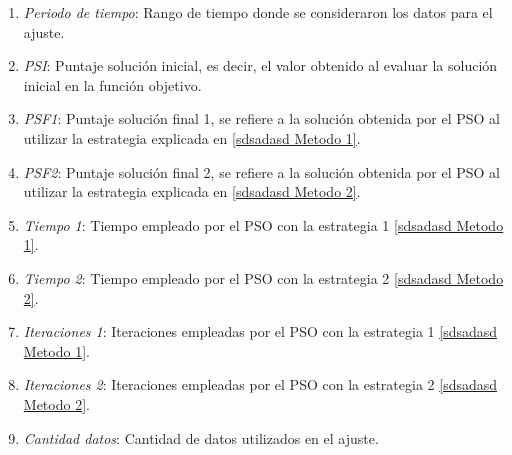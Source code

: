 \begin{enumerate}
    \item \emph{Periodo de tiempo}: Rango de tiempo donde se consideraron los datos para el ajuste.
    \item \emph{PSI}: Puntaje solución inicial, es decir, el valor obtenido al evaluar la solución inicial en la función objetivo.
    \item \emph{PSF1}: Puntaje solución final 1, se refiere a la solución obtenida por el PSO al utilizar la estrategia explicada en \ref{sdsadasd Metodo 1}.
    \item \emph{PSF2}:  Puntaje solución final 2, se refiere a la solución obtenida por el PSO al utilizar la estrategia explicada en \ref{sdsadasd Metodo 2}.
    \item \emph{Tiempo 1}: Tiempo empleado por el PSO con la estrategia 1 \ref{sdsadasd Metodo 1}. 
    \item \emph{Tiempo 2}: Tiempo empleado por el PSO con la estrategia 2 \ref{sdsadasd Metodo 2}. 
    \item \emph{Iteraciones 1}: Iteraciones empleadas por el PSO con la estrategia 1 \ref{sdsadasd Metodo 1}. 
    \item \emph{Iteraciones 2}: Iteraciones empleadas por el PSO con la estrategia 2 \ref{sdsadasd Metodo 2}. 
    \item \emph{Cantidad datos}: Cantidad de datos utilizados en el ajuste.
\end{enumerate}


